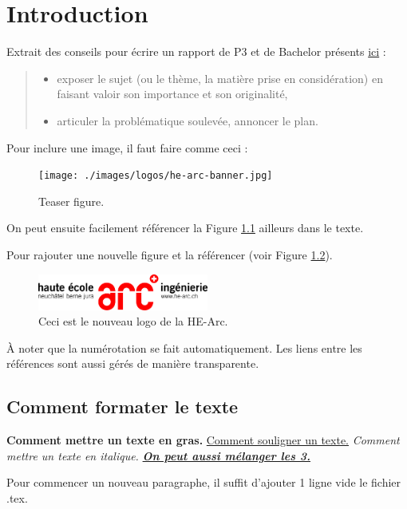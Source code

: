 \chapter{Introduction}
Extrait des conseils pour écrire un rapport de P3 et de Bachelor présents \href{https://gitlab-etu.ing.he-arc.ch/isc/documentation/projet-p3-et-bachelor/-/wikis/help-report}{ici} :
\begin{quote}    
  \begin{itemize}   
    \item exposer le sujet (ou le thème, la matière prise en considération) en faisant valoir son importance et son originalité,
    \item articuler la problématique soulevée,
    annoncer le plan.
  \end{itemize}
\end{quote}

Pour inclure une image, il faut faire comme ceci :
\begin{figure}[h]
  \centering
  \texttt{[image: ./images/logos/he-arc-banner.jpg]}
  \caption{Teaser figure.}
  \label{Fig_teaser}
\end{figure}

On peut ensuite facilement référencer la Figure \ref{Fig_teaser} ailleurs dans le texte.

Pour rajouter une nouvelle figure et la référencer (voir Figure \ref{Fig_exemple}).
\begin{figure}[h]
    \centering
    \includegraphics[width=0.5\textwidth]{./images/logos/he-arc-logo.png}
    \caption{Ceci est le nouveau logo de la HE-Arc.}
    \label{Fig_exemple}
\end{figure}

À noter que la numérotation se fait automatiquement.
Les liens entre les références sont aussi gérés de manière transparente.

\section{Comment formater le texte}
\textbf{Comment mettre un texte en gras.}
\underline{Comment souligner un texte.} 
\textit{Comment mettre un texte en italique.}
\underline{\textbf{\textit{On peut aussi mélanger les 3.}}}

Pour commencer un nouveau paragraphe, il suffit d'ajouter 1 ligne vide le fichier .tex.

